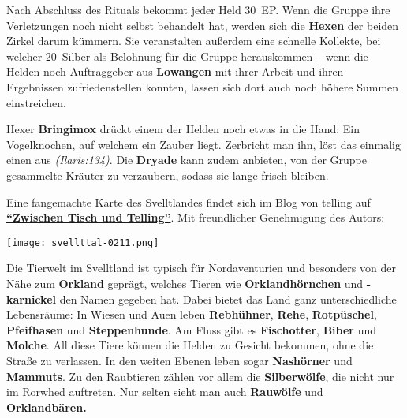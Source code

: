 \vfill


Nach Abschluss des Rituals bekommt jeder Held 30~EP.
Wenn die Gruppe ihre Verletzungen noch nicht selbst behandelt hat, werden sich die \textbf{Hexen} der beiden Zirkel darum kümmern.
Sie veranstalten außerdem eine schnelle Kollekte, bei welcher 20~Silber als Belohnung für die Gruppe herauskommen -- wenn die Helden noch Auftraggeber aus \textbf{Lowangen} mit ihrer Arbeit und ihren Ergebnissen zufriedenstellen konnten, lassen sich dort auch noch höhere Summen einstreichen. 

Hexer \textbf{Bringimox} drückt einem der Helden noch etwas in die Hand:
Ein Vogelknochen, auf welchem ein Zauber liegt. Zerbricht man ihn, löst das einmalig einen  aus \emph{(Ilaris:134)}.
Die \textbf{Dryade} kann zudem anbieten, von der Gruppe gesammelte Kräuter zu verzaubern, sodass sie lange frisch bleiben.

\neueseite

\spaltenende
Eine fangemachte Karte des Svelltlandes findet sich im Blog von telling auf \href{https://tellingaventurien.home.blog/2023/02/27/karte-svelltland-um-1045-nach-bosparans-fall/}{\textbf{\enquote{Zwischen Tisch und Telling}}}. Mit freundlicher Genehmigung des Autors:

\begin{center}
\texttt{[image: svellttal-0211.png]}
\end{center}

\newpage

\spaltenanfang



	Die Tierwelt im Svelltland ist typisch für Nordaventurien und besonders von der Nähe zum \textbf{Orkland} geprägt,
welches Tieren wie \textbf{Orklandhörnchen} und \textbf{-karnickel} den Namen gegeben hat.
Dabei bietet das Land ganz unterschiedliche Lebensräume:
In Wiesen und Auen leben \textbf{Rebhühner}, \textbf{Rehe}, \textbf{Rotpüschel}, \textbf{Pfeifhasen} und \textbf{Steppenhunde}.
Am Fluss gibt es \textbf{Fischotter}, \textbf{Biber} und \textbf{Molche}. All diese Tiere können die Helden zu Gesicht bekommen, ohne die Straße zu verlassen. In den weiten Ebenen leben sogar \textbf{Nashörner} und \textbf{Mammuts}.
Zu den Raubtieren zählen vor allem die \textbf{Silberwölfe}, die nicht nur im Rorwhed auftreten. Nur selten sieht man auch \textbf{Rauwölfe} und \textbf{Orklandbären.}

